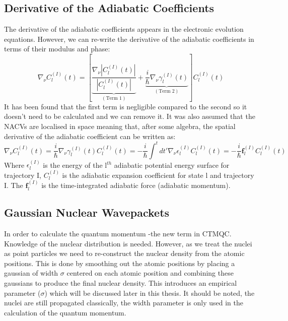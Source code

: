 \subsection{Derivative of the Adiabatic Coefficients}
The derivative of the adiabatic coefficients appears in the electronic evolution equations. However, we can re-write the derivative of the adiabatic coefficients in terms of their modulus and phase:
\begin{equation}
  \nabla_{\nu} C_{l}^{(I)}(t) = \left[ \underbrace{\frac{\nabla_{\nu} |C_{l}^{(I)}(t)|}{|C_{l}^{(I)}(t)|}}_{(\text{Term 1})} + \underbrace{\frac{i}{\hbar} \nabla_{\nu} \gamma_{l}^{(I)}(t)}_{(\text{Term 2})}\right] C_{l}^{(I)}(t)
\end{equation}
It has been found that the first term is negligible compared to the second \cite{abedi_dynamical_2013, agostini_mixed_2013, agostini_exact_2015} so it doesn't need to be calculated and we can remove it. It was also assumed that the NACVs are localised in space meaning that, after some algebra, the spatial derivative of the adiabatic coefficient can be written as:
\begin{equation}
  \nabla_{\nu} C_{l}^{(I)}(t) = \frac{i}{\hbar} \nabla_{\nu} \gamma_{l}^{(I)}(t) C_{l}^{(I)}(t) = -\frac{i}{\hbar} \int^{t} dt' \nabla_{\nu} \epsilon_{l}^{(I)} C_{l}^{(I)}(t) = -\frac{i}{\hbar} \mathbf{f}_{l}^{(I)} C_{l}^{(I)}(t)
  \label{eq:hist_force}
\end{equation}
Where $\epsilon_{l}^{(I)}$ is the energy of the l$^{th}$ adiabatic potential energy surface for trajectory I, $C_{l}^{(I)}$ is the adiabatic expansion coefficient for state l and trajectory I. The $\mathbf{f}_{l}^{(I)}$ is the time-integrated adiabatic force (adiabatic momentum).
\subsection{Gaussian Nuclear Wavepackets}
In order to calculate the quantum momentum -the new term in CTMQC. Knowledge of the nuclear distribution is needed. However, as we treat the nuclei as point particles we need to re-construct the nuclear density from the atomic positions. This is done by smoothing out the atomic positions by placing a gaussian of width $\sigma$ centered on each atomic position and combining these gaussians to produce the final nuclear density. This introduces an empirical parameter ($\sigma$) which will be discussed later in this thesis. It should be noted, the nuclei are still propagated classically, the width parameter is only used in the calculation of the quantum momentum.
